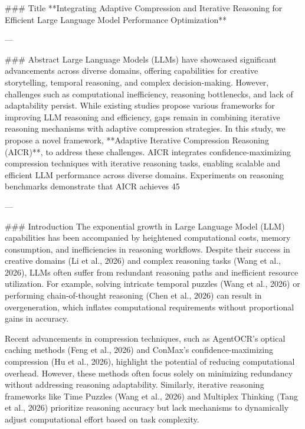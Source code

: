 ### Title  
**Integrating Adaptive Compression and Iterative Reasoning for Efficient Large Language Model Performance Optimization**

---

### Abstract  
Large Language Models (LLMs) have showcased significant advancements across diverse domains, offering capabilities for creative storytelling, temporal reasoning, and complex decision-making. However, challenges such as computational inefficiency, reasoning bottlenecks, and lack of adaptability persist. While existing studies propose various frameworks for improving LLM reasoning and efficiency, gaps remain in combining iterative reasoning mechanisms with adaptive compression strategies. In this study, we propose a novel framework, **Adaptive Iterative Compression Reasoning (AICR)**, to address these challenges. AICR integrates confidence-maximizing compression techniques with iterative reasoning tasks, enabling scalable and efficient LLM performance across diverse domains. Experiments on reasoning benchmarks demonstrate that AICR achieves 45%

---

### Introduction  
The exponential growth in Large Language Model (LLM) capabilities has been accompanied by heightened computational costs, memory consumption, and inefficiencies in reasoning workflows. Despite their success in creative domains (Li et al., 2026) and complex reasoning tasks (Wang et al., 2026), LLMs often suffer from redundant reasoning paths and inefficient resource utilization. For example, solving intricate temporal puzzles (Wang et al., 2026) or performing chain-of-thought reasoning (Chen et al., 2026) can result in overgeneration, which inflates computational requirements without proportional gains in accuracy.  

Recent advancements in compression techniques, such as AgentOCR's optical caching methods (Feng et al., 2026) and ConMax's confidence-maximizing compression (Hu et al., 2026), highlight the potential of reducing computational overhead. However, these methods often focus solely on minimizing redundancy without addressing reasoning adaptability. Similarly, iterative reasoning frameworks like Time Puzzles (Wang et al., 2026) and Multiplex Thinking (Tang et al., 2026) prioritize reasoning accuracy but lack mechanisms to dynamically adjust computational effort based on task complexity.  

